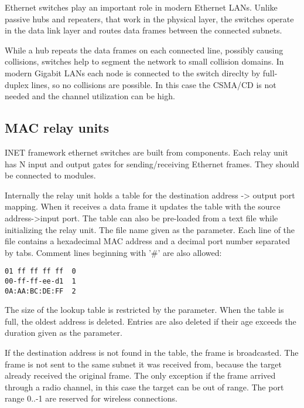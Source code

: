 Ethernet switches play an important role in modern Ethernet LANs. Unlike
passive hubs and repeaters, that work in the physical layer, the switches
operate in the data link layer and routes data frames between the connected
subnets.

While a hub repeats the data frames on each connected line, possibly causing
collisions, switches help to segment the network to small collision domains.
In modern Gigabit LANs each node is connected to the switch direclty
by full-duplex lines, so no collisions are possible. In this case the
CSMA/CD is not needed and the channel utilization can be high.

\subsection{MAC relay units}

INET framework ethernet switches are built from 
components. Each relay unit has N input and output gates for sending/receiving
Ethernet frames. They should be connected to  modules.

Internally the relay unit holds a table for the destination address -> output
port mapping. When it receives a data frame it updates the table with the
source address->input port. The table can also be pre-loaded from a text file
while initializing the relay unit. The file name given as the 
parameter. Each line of the file contains a hexadecimal MAC address and a decimal port
number separated by tabs. Comment lines beginning with '\#' are also allowed:

\begin{verbatim}
01 ff ff ff ff	0
00-ff-ff-ee-d1	1
0A:AA:BC:DE:FF	2
\end{verbatim}


The size of the lookup table is restricted by the  parameter.
When the table is full, the oldest address is deleted. Entries are also deleted
if their age exceeds the duration given as the  parameter.

If the destination address is not found in the table, the frame is broadcasted.
The frame is not sent to the same subnet it was received from, because the
target already received the original frame. The only exception if the frame
arrived through a radio channel, in this case the target can be out of range.
The port range 0..-1 are reserved for wireless connections.

